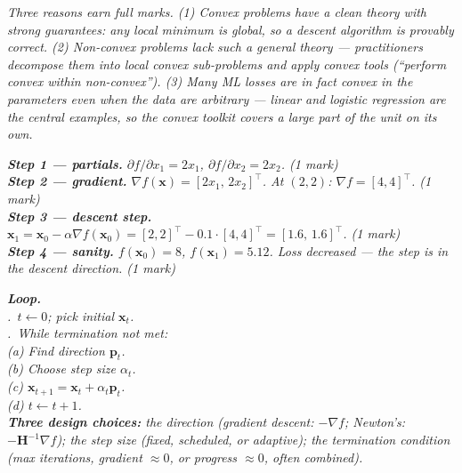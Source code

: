 \documentclass[11pt, a4paper]{article}
\newcommand{\doflag}{\textcolor{defBd}{\textbf{[DO]}}\,}
\begin{document}
\begin{exambox}
\textit{Three reasons earn full marks. (1) Convex problems have a clean theory with strong guarantees: any local minimum is global, so a descent algorithm is provably correct. (2) Non-convex problems lack such a general theory — practitioners decompose them into local convex sub-problems and apply convex tools (``perform convex within non-convex''). (3) Many ML losses are in fact convex in the parameters even when the data are arbitrary — linear and logistic regression are the central examples, so the convex toolkit covers a large part of the unit on its own.}
\end{exambox}

\begin{exambox}[{\doflag{}Compute: gradient of $f(x_1, x_2) = x_1^2 + x_2^2$ at $\mathbf{x} = (2,2)$, and one steepest-descent step with $\alpha = 0.1$.}]
\textit{\textbf{Step 1 — partials.} $\partial f / \partial x_1 = 2x_1$, $\partial f / \partial x_2 = 2x_2$. (1 mark)}\\[0.3em]
\textit{\textbf{Step 2 — gradient.} $\nabla f(\mathbf{x}) = [2x_1,\,2x_2]^\top$. At $(2,2)$: $\nabla f = [4,4]^\top$. (1 mark)}\\[0.3em]
\textit{\textbf{Step 3 — descent step.} $\mathbf{x}_1 = \mathbf{x}_0 - \alpha\nabla f(\mathbf{x}_0) = [2,2]^\top - 0.1\cdot[4,4]^\top = [1.6,\,1.6]^\top$. (1 mark)}\\[0.3em]
\textit{\textbf{Step 4 — sanity.} $f(\mathbf{x}_0) = 8$, $f(\mathbf{x}_1) = 5.12$. Loss decreased — the step is in the descent direction. (1 mark)}
\end{exambox}

\begin{exambox}
\textit{\textbf{Loop.}}\\[0.2em]
\textit{.\ $t \leftarrow 0$; pick initial $\mathbf{x}_t$.}\\
\textit{.\ While termination not met:}\\
\textit{\qquad (a) Find direction $\mathbf{p}_t$.}\\
\textit{\qquad (b) Choose step size $\alpha_t$.}\\
\textit{\qquad (c) $\mathbf{x}_{t+1} = \mathbf{x}_t + \alpha_t\mathbf{p}_t$.}\\
\textit{\qquad (d) $t \leftarrow t+1$.}\\[0.2em]
\textit{\textbf{Three design choices:} the direction (gradient descent: $-\nabla f$; Newton's: $-\mathbf{H}^{-1}\nabla f$); the step size (fixed, scheduled, or adaptive); the termination condition (max iterations, gradient $\approx 0$, or progress $\approx 0$, often combined).}
\end{exambox}
\end{document}
